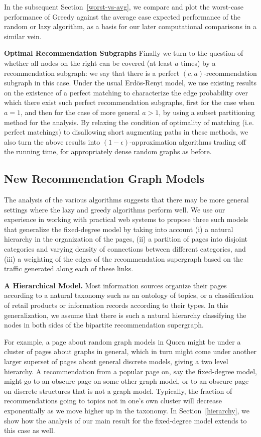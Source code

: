 In the subsequent Section~\ref{worst-vs-avg}, we compare and plot the worst-case
performance of Greedy against the average case expected performance of the random
or lazy algorithm, as a basis for our later computational comparisons in a
similar vein. \vs

{\bf Optimal Recommendation Subgraphs}
Finally we turn to the question of whether all nodes on the right can be covered
(at least $a$ times) by a recommendation subgraph: we say that there is a
perfect $(c,a)$-recommendation subgraph in this case. Under the usual
Erd\"os-Renyi model, we use existing results on the existence of a perfect
matching to characterize the edge probability over which there exist such
perfect recommendation subgraphs, first for the case when $a=1$, and then for
the case of more general $a > 1$, by using a subset partitioning method for the
analysis. By relaxing the condition of optimality of matching (i.e. perfect
matchings) to disallowing short augmenting paths in these methods, we also turn
the above results into $(1-\epsilon)$-approximation algorithms trading off the
running time, for appropriately dense random graphs as before. \vs

\subsection{New Recommendation Graph Models}
The analysis of the various algorithms suggests that there may be more general
settings where the lazy and greedy algorithms perform well. We use our
experience in working with practical web systems to propose three such models
that generalize the fixed-degree model by taking into account (i) a natural
hierarchy in the organization of the pages, (ii) a partition of pages into
disjoint categories and varying density of connections between different
categories, and (iii) a weighting of the edges of the recommendation supergraph
based on the traffic generated along each of these links. \vs

{\bf A Hierarchical Model.} 
Most information sources organize their pages according to a natural taxonomy
such as an ontology of topics, or a classification of retail products or
information records according to their types. In this generalization, we assume
that there is such a natural hierarchy classifying the nodes in both sides of
the bipartite recommendation supergraph. 


For example, a page about random graph models in Quora might be under a cluster
of pages about graphs in general, which in turn might come under another larger
superset of pages about general discrete models, giving a two level hierarchy.
A recommendation from a popular page on, say the fixed-degree model, might go to
an obscure page on some other graph model, or to an obscure page on discrete
structures that is not a graph model. Typically, the fraction of recommendations
going to topics not in one's own cluster will decrease exponentially as we move
higher up in the taxonomy. In Section~\ref{hierarchy}, we show how the analysis
of our main result for the fixed-degree model extends to this case as well. \vs


